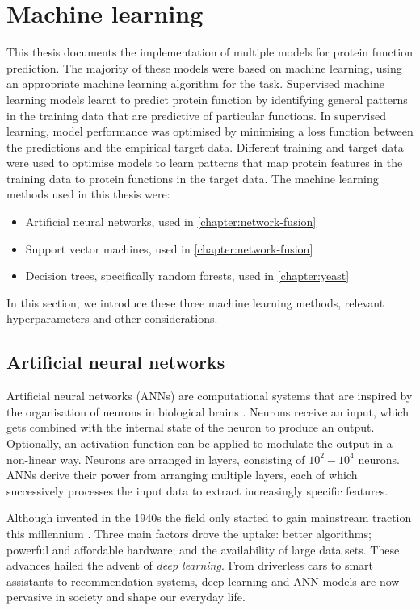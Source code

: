 \section{Machine learning}
\label{sec:intro-ml}

This thesis documents the implementation of multiple models for protein function prediction. The majority of these models were based on machine learning, using an appropriate machine learning algorithm for the task. Supervised machine learning models learnt to predict protein function by identifying general patterns in the training data that are predictive of particular functions. In supervised learning, model performance was optimised by minimising a loss function between the predictions and the empirical target data. Different training and target data were used to optimise models to learn patterns that map protein features in the training data to protein functions in the target data. The machine learning methods used in this thesis were:

\begin{itemize}
    \item Artificial neural networks, used in \ref{chapter:network-fusion}
    \item Support vector machines, used in \ref{chapter:network-fusion}
    \item Decision trees, specifically random forests, used in \ref{chapter:yeast}
\end{itemize}

In this section, we introduce these three machine learning methods, relevant hyperparameters and other considerations.

\subsection{Artificial neural networks}

Artificial neural networks (ANNs) are computational systems that are inspired by the organisation of neurons in biological brains \cite{McCulloch1943}. Neurons receive an input, which gets combined with the internal state of the neuron to produce an output. Optionally, an activation function can be applied to modulate the output in a non-linear way. Neurons are arranged in layers, consisting of $10^2-10^4$ neurons. ANNs derive their power from arranging multiple layers, each of which successively processes the input data to extract increasingly specific features.

Although invented in the 1940s the field only started to gain mainstream traction this millennium \cite{Schmidhuber2015}. Three main factors drove the uptake: better algorithms; powerful and affordable hardware; and the availability of large data sets. These advances hailed the advent of \emph{deep learning}. From driverless cars to smart assistants to recommendation systems, deep learning and ANN models are now pervasive in society and shape our everyday life.

